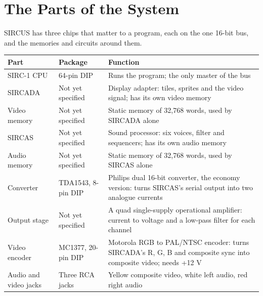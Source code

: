 \section{The Parts of the System}

SIRCUS has three chips that matter to a program, each on the one 16-bit bus, and the memories and circuits around them.

\begin{table}[H]
	\centering
	\small
	\begin{tabular}{llp{5.2cm}}
		\toprule
		\textbf{Part}         & \textbf{Package}     & \textbf{Function}                                                                                                 \\
		\midrule
		SIRC-1 CPU            & 64-pin DIP           & Runs the program; the only master of the bus                                                                      \\
		SIRCADA               & Not yet specified    & Display adapter: tiles, sprites and the video signal; has its own video memory                                    \\
		Video memory          & Not yet specified    & Static memory of 32,768 words, used by SIRCADA alone                                                              \\
		SIRCAS                & Not yet specified    & Sound processor: six voices, filter and sequencers; has its own audio memory                                      \\
		Audio memory          & Not yet specified    & Static memory of 32,768 words, used by SIRCAS alone                                                               \\
		Converter             & TDA1543, 8-pin DIP   & Philips dual 16-bit converter, the economy version: turns SIRCAS's serial output into two analogue currents       \\
		Output stage          & Not yet specified    & A quad single-supply operational amplifier: current to voltage and a low-pass filter for each channel             \\
		Video encoder         & MC1377, 20-pin DIP   & Motorola RGB to PAL/NTSC encoder: turns SIRCADA's R, G, B and composite sync into composite video; needs +12 V    \\
		Audio and video jacks & Three RCA jacks      & Yellow composite video, white left audio, red right audio                                                         \\

\end{tabular}
\end{table}
